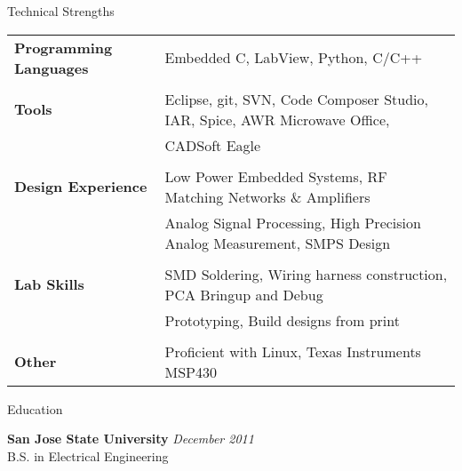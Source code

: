 \documentclass{resume} %
\begin{document}
\pagebreak
\begin{rSection}{Technical Strengths}

\begin{tabular}{ @{} >{\bfseries}l @{\hspace{6ex}} l }
Programming Languages & Embedded C, LabView, Python, C/C++  \\ \\
Tools & Eclipse, git, SVN, Code Composer Studio, IAR, Spice, AWR Microwave Office, \\
 & CADSoft Eagle\\ \\
Design Experience & Low Power Embedded Systems, RF Matching Networks \& Amplifiers\\
 & Analog Signal Processing, High Precision Analog Measurement, SMPS Design\\ \\
 
Lab Skills & SMD Soldering, Wiring harness construction, PCA Bringup and Debug\\
 & Prototyping, Build designs from print \\ \\
 
Other & Proficient with Linux, Texas Instruments MSP430 \\
\end{tabular}

\end{rSection}


\begin{rSection}{Education}

{\bf San Jose State University} \hfill {\em December 2011} \\ 
B.S. in Electrical Engineering \\

\end{rSection}





\end{document}
